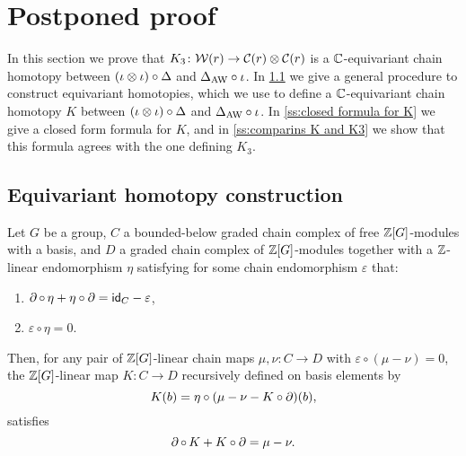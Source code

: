 
\section{Postponed proof}\label{s:postponed}

In this section we prove that $K_3 \colon \mathcal{W}(r) \to \mathcal{C}(r) \otimes \mathcal{C}(r)$ is a $\mathbb{C}$-equivariant chain homotopy between $(\iota \otimes \iota) \circ \Delta$ and $\Delta_{\operatorname{AW}} \circ \iota$.
In \cref{ss:equivariant homotopy general} we give a general procedure to construct equivariant homotopies, which we use to define a $\mathbb{C}$-equivariant chain homotopy $K$ between $(\iota\otimes \iota) \circ \Delta$ and $\Delta_{\operatorname{AW}} \circ \iota$.
In \cref{ss:closed formula for K} we give a closed form formula for $K$, and in \cref{ss:comparins K and K3} we show that this formula agrees with the one defining $K_3$.

\subsection{Equivariant homotopy construction}\label{ss:equivariant homotopy general}

\begin{lemma}
	Let $G$ be a group, $C$ a bounded-below graded chain complex of free $\mathbb{Z}[G]$-modules with a basis, and $D$ a graded chain complex of $\mathbb{Z}[G]$-modules together with a $\mathbb{Z}$-linear endomorphism $\eta$ satisfying for some chain endomorphism $\varepsilon$ that:
	\begin{enumerate}
		\item $\operatorname{\partial} \circ \, \eta + \eta \circ \operatorname{\partial} = \mathsf{id}_C - \varepsilon$,
		\item $\varepsilon \circ \eta = 0$.
	\end{enumerate}
	Then, for any pair of $\mathbb{Z}[G]$-linear chain maps $\mu,\nu \colon C \to D$ with $\varepsilon \circ (\mu-\nu) = 0$, the $\mathbb{Z}[G]$-linear map $K \colon C \to D$ recursively defined on basis elements by
	\[
	K(b) = \eta \circ (\mu - \nu - K \circ \operatorname{\partial})(b),
	\]
	satisfies
	\[
	\operatorname{\partial} \circ \, K + K \circ \operatorname{\partial} = \mu - \nu.
	\]
\end{lemma}

